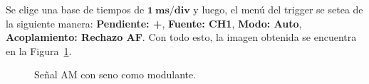       
      Se elige una base de tiempos de $\mathbf{1~ms/div}$ y luego, el menú del trigger se setea de la siguiente manera:
      \textbf{Pendiente: +}, \textbf{Fuente: CH1}, \textbf{Modo: Auto}, \textbf{Acoplamiento: Rechazo AF}. Con
      todo esto, la imagen obtenida se encuentra en la Figura~\ref{fig:SeñalAM1EnTiempo}.
      
      \begin{figure}[H]
        \centering
        \caption{Señal AM con seno como modulante.}
        \label{fig:SeñalAM1EnTiempo}
      \end{figure}

